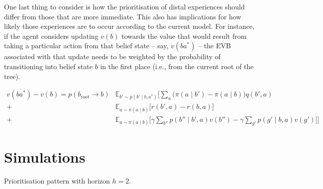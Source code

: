 \documentclass{article}
\begin{document}
One last thing to consider is how the prioritisation of distal experiences should 
differ from those that are more immediate. This also has implications for how likely 
those experiences are to occur according to the current model. 
\bigbreak
For instance, if the agent considers updating $v(b)$ towards the value that would result 
from taking a particular action from that belief state -- say, $v(ba^*)$ -- the EVB associated 
with that update needs to be weighted by the probability of transitioning into 
belief state $b$ in the first place (i.e., from the current root of the tree).

\begin{align}
    v(ba^*)-v(b) = p(b_{\text{root}}\rightarrow b) &\mathbb{E}_{b'\sim p(b'\mid b, a^*)}\Big[\sum_a \big(\pi(a\mid b')-\pi(a\mid b)\big)q(b',a) \\
    +& \mathbb{E}_{a\sim \pi(a\mid b)}\big[r(b',a) - r(b,a)\big] \nonumber \\ 
    +& \mathbb{E}_{a\sim \pi(a\mid b)}\big[\gamma \sum_{b''}p(b''\mid b', a)v(b'') - \gamma \sum_{g'}p(g'\mid b, a)v(g') \big] \Big] \nonumber
\end{align}

\newpage
\section*{Simulations}

Prioritisation pattern with horizon $h=2$.
\vspace{1cm}


\end{document}
